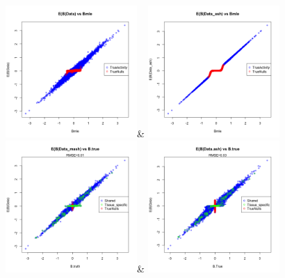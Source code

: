 \begin{figure}[htbp]
\includegraphics[width=5cm]{Figures/scatterplotfittedbspec.png}&
\includegraphics[width=5cm]{Figures/scatterplotfitted_bspec_ash.png}\\
\hfill
\includegraphics[width=5cm]{Figures/scatterplot_truthbspec.png}&
\includegraphics[width=5cm]{Figures/scatterplot_TRUTHashbspec.png}

\end{figure}
